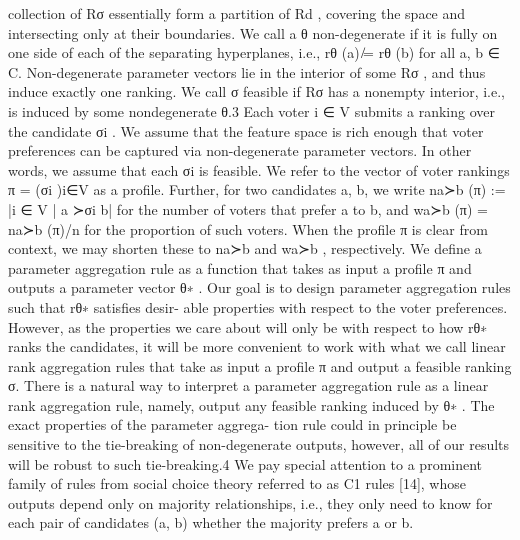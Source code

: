 \documentclass[10pt]{article}
\begin{document}
\begin{ReviewVerbatim}
collection of {Rσ } essentially form a partition of Rd , covering the space and intersecting only at
their boundaries.
We call a θ non-degenerate if it is fully on one side of each of the separating hyperplanes, i.e.,
rθ (a) ̸= rθ (b) for all a, b ∈ C. Non-degenerate parameter vectors lie in the interior of some Rσ ,
and thus induce exactly one ranking. We call σ feasible if Rσ has a nonempty interior, i.e., is induced
by some nondegenerate θ.3
Each voter i ∈ V submits a ranking over the candidate σi . We assume that the feature space is
rich enough that voter preferences can be captured via non-degenerate parameter vectors. In other
words, we assume that each σi is feasible. We refer to the vector of voter rankings π = (σi )i∈V as
a profile. Further, for two candidates a, b, we write na≻b (π) := |{i ∈ V | a ≻σi b}| for the number
of voters that prefer a to b, and wa≻b (π) = na≻b (π)/n for the proportion of such voters. When the
profile π is clear from context, we may shorten these to na≻b and wa≻b , respectively.
We define a parameter aggregation rule as a function that takes as input a profile π and outputs a
parameter vector θ∗ . Our goal is to design parameter aggregation rules such that rθ∗ satisfies desir-
able properties with respect to the voter preferences. However, as the properties we care about will
only be with respect to how rθ∗ ranks the candidates, it will be more convenient to work with what
we call linear rank aggregation rules that take as input a profile π and output a feasible ranking σ.
There is a natural way to interpret a parameter aggregation rule as a linear rank aggregation rule,
namely, output any feasible ranking induced by θ∗ . The exact properties of the parameter aggrega-
tion rule could in principle be sensitive to the tie-breaking of non-degenerate outputs, however, all
of our results will be robust to such tie-breaking.4
We pay special attention to a prominent family of rules from social choice theory referred to as C1
rules [14], whose outputs depend only on majority relationships, i.e., they only need to know for
each pair of candidates (a, b) whether the majority prefers a or b.
\end{ReviewVerbatim}
\end{document}
